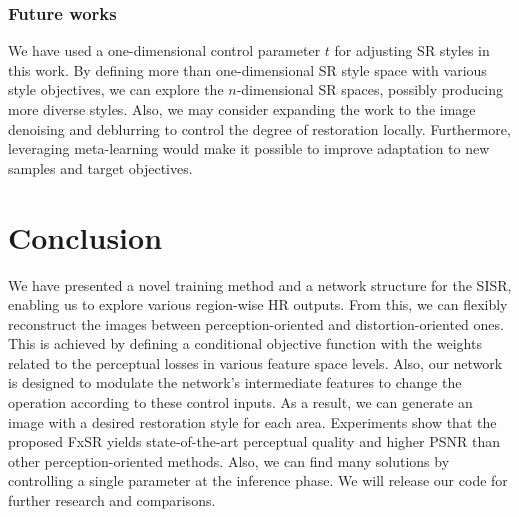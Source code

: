 \documentclass{article}
\begin{document}
\subsubsection{Future works}
We have used a one-dimensional control parameter $t$ for adjusting SR styles in this work. By defining more than one-dimensional SR style space with various style objectives, we can explore the $n$-dimensional SR spaces, possibly producing more diverse styles. Also, we may consider expanding the work to the image denoising and deblurring to control the degree of restoration locally. Furthermore, leveraging meta-learning would make it possible to improve adaptation to new samples and target objectives.

\section{Conclusion}
We have presented a novel training method and a network structure for the SISR, enabling us to explore various region-wise HR outputs. From this, we can flexibly reconstruct the images between perception-oriented and distortion-oriented ones. This is achieved by defining a conditional objective function with the weights related to the perceptual losses in various feature space levels. Also, our network is designed to modulate the network's intermediate features to change the operation according to these control inputs. As a result, we can generate an image with a desired restoration style for each area. Experiments show that the proposed FxSR yields state-of-the-art perceptual quality and higher PSNR than other perception-oriented methods. Also, we can find many solutions by controlling a single parameter at the inference phase. We will release our code for further research and comparisons.



\end{document}

